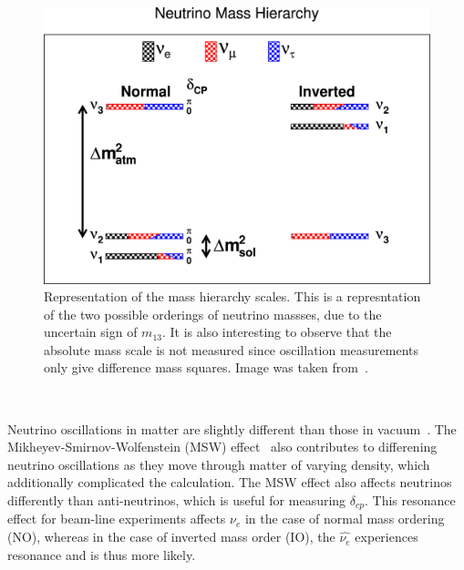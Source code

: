 \begin{figure}[]
\centering
\includegraphics[width=\textwidth]{images/mass_hierarchy.jpg}
\caption{Representation of the mass hierarchy scales. This is a represntation of the two possible orderings of neutrino massses, due to the uncertain sign of $m_{13}$. It is also interesting to observe that the absolute mass scale is not measured since oscillation measurements only give difference mass squares. Image was taken from~\citep{QIAN20151}.}
\end{figure}~\label{fig:mass_hierarchy}

Neutrino oscillations in matter are slightly different than those in vacuum~\citep{PhysRevD.17.2369}.
The Mikheyev-Smirnov-Wolfenstein (MSW) effect~\citep{Smirnov2004TheME} also contributes to differening neutrino oscillations as they move through matter of varying density, which additionally complicated the calculation.
The MSW effect also affects neutrinos differently than anti-neutrinos, which is useful for measuring $\delta_{cp}$.
This resonance effect for beam-line experiments affects $\nu_{e}$ in the case of normal mass ordering (NO), whereas in the case of inverted mass order (IO), the $\hat{\nu_{e}}$ experiences resonance and is thus more likely.

